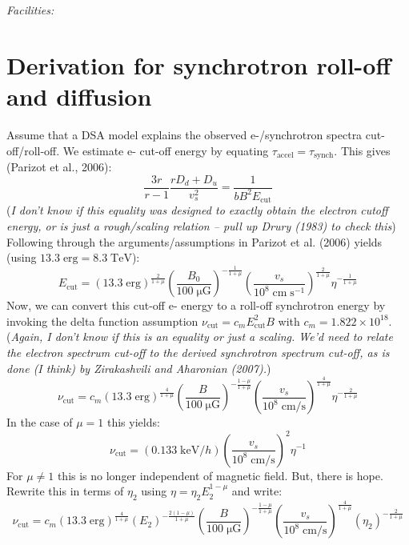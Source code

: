 \documentclass[iop, apj, numberedappendix, twocolappendix]{emulateapj}
\newcommand*{\mt}{\mathrm}
\newcommand*{\unit}[1]{\;\mt{#1}}  %
\newcommand*{\Ecut}{E_{\mt{cut}}}
\newcommand*{\muG}{\unit{\mu G}}
\begin{document}
{\it Facilities:} 

\clearpage
\appendix

\setcounter{table}{0}
\renewcommand{\thetable}{A\arabic{table}}
\setcounter{figure}{0}
\renewcommand{\thefigure}{A\arabic{figure}}

\section{Derivation for synchrotron roll-off and diffusion}


Assume that a DSA model explains the observed e-/synchrotron spectra
cut-off/roll-off.  We estimate e- cut-off energy by equating
$\tau_{\mt{accel}} = \tau_{\mt{synch}}$.  This gives (Parizot et al., 2006):
\[
    \frac{3r}{r-1} \frac{r D_d + D_u}{v_s^2} = \frac{1}{b B^2 \Ecut}
\]
(\emph{I don't know if this equality was designed to exactly obtain the electron
cutoff energy, or is just a rough/scaling relation -- pull up Drury (1983) to
check this})
Following through the arguments/assumptions in Parizot et al. (2006) yields
(using $13.3 \unit{erg} = 8.3 \unit{TeV}$):
\[
    \Ecut =
        \left( 13.3 \unit{erg} \right)^{\frac{2}{1+\mu}}
        \left( \frac{B_0}{100 \muG} \right)^{-\frac{1}{1+\mu}}
        \left( \frac{v_s}{10^8 \unit{cm\;s^{-1}}} \right)^{\frac{2}{1+\mu}}
        \eta^{-\frac{1}{1+\mu}}
\]
Now, we can convert this cut-off e- energy to a roll-off synchrotron energy by
invoking the delta function assumption $\nu_{\mt{cut}} = c_m \Ecut^2 B$ with
$c_m = 1.822 \times 10^{18}$.
(\emph{Again, I don't know if this is an equality or just a scaling.  We'd need
to relate the electron spectrum cut-off to the derived synchrotron spectrum
cut-off, as is done (I think) by Zirakashvili and Aharonian (2007).})
\[
    \nu_{\mt{cut}} = c_m
        \left( 13.3 \unit{erg} \right)^{\frac{4}{1+\mu}}
        \left( \frac{B}{100\muG} \right)^{-\frac{1-\mu}{1+\mu}}
        \left( \frac{v_s}{10^8 \unit{cm/s}} \right)^{\frac{4}{1+\mu}}
        \eta^{-\frac{2}{1+\mu}}
\]
In the case of $\mu = 1$ this yields:
\[
    \nu_{\mt{cut}} = (0.133 \unit{keV} / h)
        \left( \frac{v_s}{10^8 \unit{cm/s}} \right)^{2}
        \eta^{-1}
\]
For $\mu \neq 1$ this is no longer independent of magnetic field.  But,
there is hope.  Rewrite this in terms of $\eta_2$ using
$\eta = \eta_2 E_2^{1-\mu}$ and write:
\[
    \nu_{\mt{cut}} = c_m
        \left( 13.3 \unit{erg} \right)^{\frac{4}{1+\mu}}
        \left( E_2 \right)^{-\frac{2(1-\mu)}{1+\mu}}
        \left( \frac{B}{100\muG} \right)^{-\frac{1-\mu}{1+\mu}}
        \left( \frac{v_s}{10^8 \unit{cm/s}} \right)^{\frac{4}{1+\mu}}
        \left( \eta_2 \right)^{-\frac{2}{1+\mu}}
\]
\end{document}
